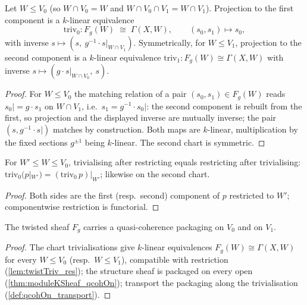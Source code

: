 \begin{definition}
  \label{def:twistTriv}
  \leanok
  Let \(W \le V_0\) (so \(W \cap V_0 = W\) and \(W \cap V_0 \cap V_1 = W \cap V_1\)).
  Projection to the first component is a \(k\)-linear equivalence
  \[
    \mathrm{triv}_0 : F_g(W) \;\cong\; \Gamma(X, W), \qquad (s_0, s_1) \mapsto s_0,
  \]
  with inverse \(s \mapsto (s,\ g^{-1} \cdot s|_{W \cap V_1})\). Symmetrically, for
  \(W \le V_1\), projection to the second component is a \(k\)-linear equivalence
  \(\mathrm{triv}_1 : F_g(W) \cong \Gamma(X, W)\) with inverse
  \(s \mapsto (g \cdot s|_{W \cap V_0},\ s)\).
\end{definition}
\begin{proof}
  \leanok
  For \(W \le V_0\) the matching relation of a pair \((s_0, s_1) \in F_g(W)\) reads
  \(s_0| = g \cdot s_1\) on \(W \cap V_1\), i.e.\ \(s_1 = g^{-1} \cdot s_0|\): the second
  component is rebuilt from the first, so projection and the displayed inverse are
  mutually inverse; the pair \((s, g^{-1} \cdot s|)\) matches by construction. Both maps
  are \(k\)-linear, multiplication by the fixed sections \(g^{\pm 1}\) being
  \(k\)-linear. The second chart is symmetric.
\end{proof}

\begin{lemma}
  \label{lem:twistTriv_res}
  \leanok
  For \(W' \le W \le V_0\), trivialising after restricting equals restricting after
  trivialising: \(\mathrm{triv}_0(p|_{W'}) = (\mathrm{triv}_0\, p)|_{W'}\); likewise on
  the second chart.
\end{lemma}
\begin{proof}
  \leanok
  Both sides are the first (resp.\ second) component of \(p\) restricted to \(W'\);
  componentwise restriction is functorial.
\end{proof}

\begin{theorem}
  \label{thm:twistSheaf_qcohOn}
  \leanok
  The twisted sheaf \(F_g\) carries a quasi-coherence packaging on \(V_0\) and on
  \(V_1\).
\end{theorem}
\begin{proof}
  \leanok
  The chart trivialisations give \(k\)-linear equivalences
  \(F_g(W) \cong \Gamma(X, W)\) for every \(W \le V_0\) (resp.\ \(W \le V_1\)),
  compatible with restriction (\ref{lem:twistTriv_res}); the structure sheaf is packaged
  on every open (\ref{thm:moduleKSheaf_qcohOn}); transport the packaging along the
  trivialisation (\ref{def:qcohOn_transport}).
\end{proof}


